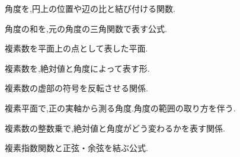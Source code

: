\begin{description}[style=nextline,leftmargin=0pt,labelsep=0pt,itemsep=5pt]
  \item[\hypertarget{term:trigonometric}{三角関数}] 角度を,円上の位置や辺の比と結び付ける関数. 
  \item[\hypertarget{term:addition}{加法定理}] 角度の和を,元の角度の三角関数で表す公式. 
  \item[\hypertarget{term:complex-plane}{複素平面}] 複素数を平面上の点として表した平面. 
  \item[\hypertarget{term:polar}{極形式}] 複素数を,絶対値と角度によって表す形. 
  \item[\hypertarget{term:conjugate}{共役}] 複素数の虚部の符号を反転させる関係. 
  \item[\hypertarget{term:argument}{偏角}] 複素平面で,正の実軸から測る角度.角度の範囲の取り方を伴う. 
  \item[\hypertarget{term:de-moivre}{ド・モアブルの定理}] 複素数の整数乗で,絶対値と角度がどう変わるかを表す関係. 
  \item[\hypertarget{term:euler}{オイラーの公式}] 複素指数関数と正弦・余弦を結ぶ公式. 
\end{description}
